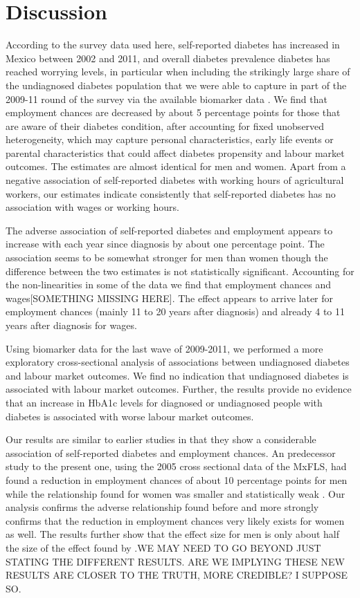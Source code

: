 \section{\noindent \label{sec:Conclusion}Discussion}

According to the survey data used here, self-reported diabetes has increased in Mexico between 2002 and 2011, and overall
diabetes prevalence diabetes has reached worrying
levels, in particular when including the strikingly large share of the undiagnosed diabetes population that we were able to capture in part of the 2009-11 round of the survey via the available biomarker data \citep{Frankenberg2015}. We
find that employment chances are decreased by about 5 percentage points for those that are aware of their
diabetes condition, after accounting for
fixed unobserved heterogeneity, which may capture personal characteristics, early
life events or parental characteristics that could affect diabetes
propensity and labour market outcomes. The estimates are almost identical
for men and women. Apart from a negative association of self-reported
diabetes with working hours of agricultural workers, our estimates
indicate consistently that self-reported diabetes has no association with wages or working hours. 

The adverse association of self-reported diabetes and employment appears
to increase with each year since diagnosis by about one percentage
point. The association seems to be somewhat stronger for men than
women though the difference between the two estimates is not statistically
significant. Accounting for the non-linearities in some of the data
we find that employment chances and wages[SOMETHING MISSING HERE]. The effect appears to arrive
later for employment chances (mainly 11 to 20 years after diagnosis)
and already 4 to 11 years after diagnosis for wages. 

Using biomarker data for the last wave of 2009-2011, we performed
a more exploratory cross-sectional analysis of associations between undiagnosed
diabetes and labour market outcomes. We find no indication that undiagnosed
diabetes is associated with labour market outcomes. Further, the results
provide no evidence that an increase in \ac{HbA1c} levels for diagnosed
or undiagnosed people with diabetes is associated with worse labour
market outcomes.

Our results are similar to earlier studies in that they show a considerable
association of self-reported diabetes and employment chances. An predecessor 
study to the present one, using the 2005 cross sectional data of
the \ac{MxFLS}, had found a reduction in employment chances of about
10 percentage points for men while the relationship found for women
was smaller and statistically weak \citep{Seuring2015}. Our analysis
confirms the adverse relationship found before and more strongly confirms
that the reduction in employment chances very likely exists for women
as well. The results further show that the effect size for men is
only about half the size of the effect found by \citet{Seuring2015}.WE MAY NEED TO GO BEYOND JUST STATING THE DIFFERENT RESULTS. ARE WE IMPLYING THESE NEW RESULTS ARE CLOSER TO THE TRUTH, MORE CREDIBLE? I SUPPOSE SO. 

